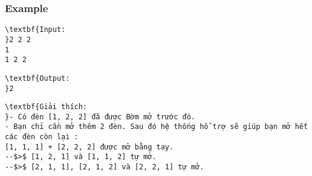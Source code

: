 \subsubsection{Example}
\begin{verbatim}
\textbf{Input:
}2 2 2
1
1 2 2\end{verbatim}
\begin{verbatim}
\textbf{Output:
}2\end{verbatim}
\begin{verbatim}
\textbf{Giải thích:
}- Có đèn [1, 2, 2] đã được Bờm mở trước đó.
- Bạn chỉ cần mở thêm 2 đèn. Sau đó hệ thống hỗ trợ sẽ giúp bạn mở hết các đèn còn lại :
[1, 1, 1] + [2, 2, 2] được mở bằng tay.
--$>$ [1, 2, 1] và [1, 1, 2] tự mở.
--$>$ [2, 1, 1], [2, 1, 2] và [2, 2, 1] tự mở.
\end{verbatim}
